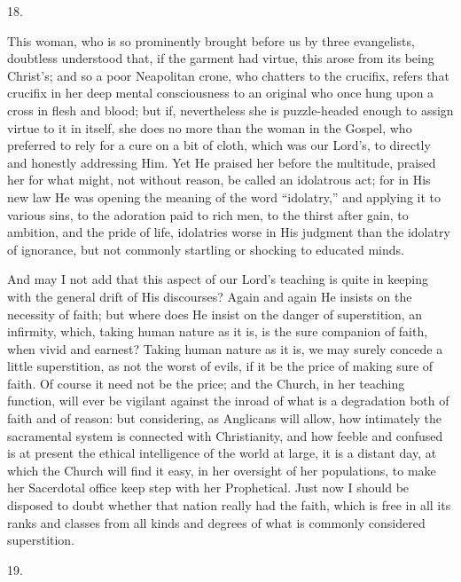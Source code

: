 18.

This woman, who is so prominently brought before us by three
evangelists, doubtless understood that, if the garment had virtue,
this arose from its being Christ's; and so a poor Neapolitan crone,
who chatters to the crucifix, refers that crucifix in her deep mental
consciousness to an original who once hung upon a cross in flesh and
blood; but if, nevertheless she is puzzle-headed enough to assign
virtue to it in itself, she does no more than the woman in the Gospel,
who preferred to rely for a cure on a bit of cloth, which was our Lord's,
to directly and honestly addressing Him. Yet He praised her before the
multitude, praised her for what might, not without reason, be called
an idolatrous act; for in His new law He was opening the meaning of
the word ``idolatry,'' and applying it to various sins, to the
adoration paid to rich men, to the thirst after gain, to ambition, and
the pride of life, idolatries worse in His judgment than the idolatry
of ignorance, but not commonly startling or shocking to educated
minds.

And may I not add that this aspect of our Lord's teaching is quite
in keeping with the general drift of His discourses? Again and again
He insists on the necessity of faith; but where does He insist on the
danger of superstition, an infirmity, which, taking human nature as it
is, is the sure companion of faith, when vivid and earnest? Taking human nature as it is, we may surely concede a little superstition, as
not the worst of evils, if it be the price of making sure of faith. Of
course it need not be the price; and the Church, in her teaching
function, will ever be vigilant against the inroad of what is a
degradation both of faith and of reason: but considering, as Anglicans
will allow, how intimately the sacramental system is connected with
Christianity, and how feeble and confused is at present the ethical
intelligence of the world at large, it is a distant day, at which the
Church will find it easy, in her oversight of her populations, to make
her Sacerdotal office keep step with her Prophetical. Just now I
should be disposed to doubt whether that nation really had the faith,
which is free in all its ranks and classes from all kinds and degrees
of what is commonly considered superstition.

19.

